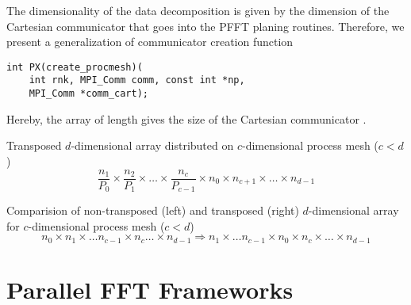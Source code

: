 The dimensionality of the data decomposition is given by the dimension of the Cartesian communicator that
goes into the PFFT planing routines. Therefore, we present a generalization of communicator creation function
\begin{lstlisting}
int PX(create_procmesh)(
    int rnk, MPI_Comm comm, const int *np,
    MPI_Comm *comm_cart);
\end{lstlisting}
Hereby, the array  of length  gives the size of the Cartesian communicator .


\newpage
Transposed $d$-dimensional array distributed on $c$-dimensional process mesh ($c<d$)
\begin{equation*}
  \frac{n_1}{P_0} \times \frac{n_2}{P_1} \times \hdots \times \frac{n_c}{P_{c-1}}  \times n_0 \times n_{c+1} \times \hdots \times n_{d-1}
\end{equation*}

Comparision of non-transposed (left) and transposed (right) $d$-dimensional array for $c$-dimensional process mesh ($c<d$)
\begin{equation*}
  n_0\times n_1\times \hdots n_{c-1} \times n_c \hdots \times n_{d-1} \Rightarrow n_1 \times \hdots n_{c-1} \times n_0 \times n_c \times \hdots \times n_{d-1}
\end{equation*}












\section{Parallel FFT Frameworks}

